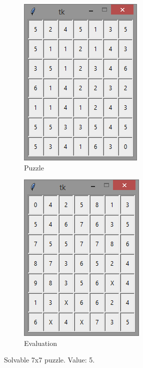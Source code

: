 \documentclass[12pt]{article}
\begin{document}
\begin{figure}[H]
	\begin{subfigure}{.5\textwidth}
		\centering
     		\includegraphics[width = .6\linewidth]{7x7_puzzle_5}
     		\caption{Puzzle}
     		\label{fig4:sfig1}
	\end{subfigure}
	\begin{subfigure}{.5\textwidth}
		\centering
		\includegraphics[width = .6\linewidth]{7x7_eval_5}
		\caption{Evaluation}
		\label{fig4:sfig2}
	\end{subfigure}
\caption{Solvable 7x7 puzzle. Value: 5.}
\label{fig:7x7good}
\end{figure}
\end{document}
